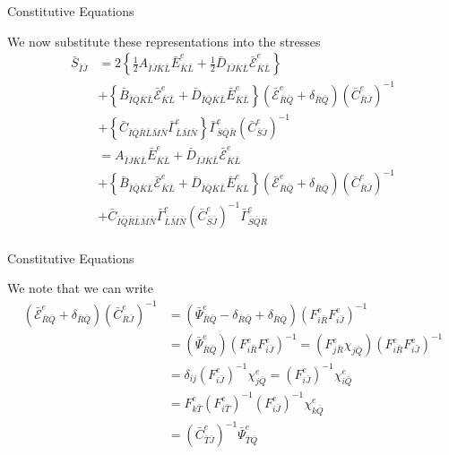 \documentclass[11pt]{beamer}
\begin{document}
\begin{frame}{Constitutive Equations}

We now substitute these representations into the stresses
\begin{align*}
\bar{S}_{\bar{I}\bar{J}} &= 2\left\{ \frac{1}{2} A_{\bar{I}\bar{J} \bar{K}\bar{L}} \bar{E}_{\bar{K}\bar{L}}^e+ \frac{1}{2} \bar{D}_{\bar{I}\bar{J}\bar{K}\bar{L}}\bar{\mathcal{E}}_{\bar{K}\bar{L}}^e\right\}\\
& + \left\{ \bar{B}_{\bar{I}\bar{Q}\bar{K}\bar{L}} \bar{\mathcal{E}}_{\bar{K}\bar{L}}^e + \bar{D}_{\bar{I}\bar{Q}\bar{K}\bar{L}}\bar{E}_{\bar{K}\bar{L}}^e \right\}\left(\bar{\mathcal{E}}_{\bar{R}\bar{Q}}^e + \delta_{\bar{R}\bar{Q}}\right)\left(\bar{C}_{\bar{R}\bar{J}}^e\right)^{-1}\\
& + \left\{ \bar{C}_{\bar{I}\bar{Q}\bar{R}\bar{L}\bar{M}\bar{N}} \bar{\Gamma}_{\bar{L}\bar{M}\bar{N}}^e \right\} \bar{\Gamma}_{\bar{S}\bar{Q}\bar{R}}^e \left(\bar{C}_{\bar{S}\bar{J}}^e\right)^{-1}\\
&= A_{\bar{I}\bar{J} \bar{K}\bar{L}} \bar{E}_{\bar{K}\bar{L}}^e+ \bar{D}_{\bar{I}\bar{J}\bar{K}\bar{L}}\bar{\mathcal{E}}_{\bar{K}\bar{L}}^e\\
& + \left\{ \bar{B}_{\bar{I}\bar{Q}\bar{K}\bar{L}} \bar{\mathcal{E}}_{\bar{K}\bar{L}}^e + \bar{D}_{\bar{I}\bar{Q}\bar{K}\bar{L}}\bar{E}_{\bar{K}\bar{L}}^e \right\}\left(\bar{\mathcal{E}}_{\bar{R}\bar{Q}}^e + \delta_{\bar{R}\bar{Q}}\right)\left(\bar{C}_{\bar{R}\bar{J}}^e\right)^{-1}\\
& + \bar{C}_{\bar{I}\bar{Q}\bar{R}\bar{L}\bar{M}\bar{N}} \bar{\Gamma}_{\bar{L}\bar{M}\bar{N}}^e \left(\bar{C}_{\bar{S}\bar{J}}^e\right)^{-1} \bar{\Gamma}_{\bar{S}\bar{Q}\bar{R}}^e\\
\end{align*}

\end{frame}

\begin{frame}{Constitutive Equations}

We note that we can write
\begin{align*}
\left(\bar{\mathcal{E}}_{\bar{R}\bar{Q}}^e + \delta_{\bar{R}\bar{Q}}\right)\left(\bar{C}_{\bar{R}\bar{J}}^e\right)^{-1} &= \left(\bar{\Psi}_{\bar{R}\bar{Q}}^e - \delta_{\bar{R}\bar{Q}} + \delta_{\bar{R}\bar{Q}}\right)\left(F_{i\bar{R}}^e F_{i\bar{J}}^e\right)^{-1}\\
&= \left(\bar{\Psi}_{\bar{R}\bar{Q}}^e\right)\left(F_{i\bar{R}}^e F_{i\bar{J}}^e\right)^{-1}= \left(F_{j\bar{R}}^e \chi_{j\bar{Q}}\right)\left(F_{i\bar{R}}^e F_{i\bar{J}}^e\right)^{-1}\\
&= \delta_{ij} \left(F_{i\bar{J}}^e\right)^{-1} \chi_{j\bar{Q}}^e = \left(F_{i\bar{J}}^e\right)^{-1} \chi_{i\bar{Q}}^e\\
&= F_{k\bar{T}}^e\left(F_{i\bar{T}}^e\right)^{-1} \left(F_{i\bar{J}}^e\right)^{-1} \chi_{k\bar{Q}}^e\\
&= \left(\bar{C}_{\bar{T}\bar{J}}^e\right)^{-1} \bar{\Psi}_{\bar{T}\bar{Q}}^e\\
\end{align*}

\end{frame}
\end{document}
